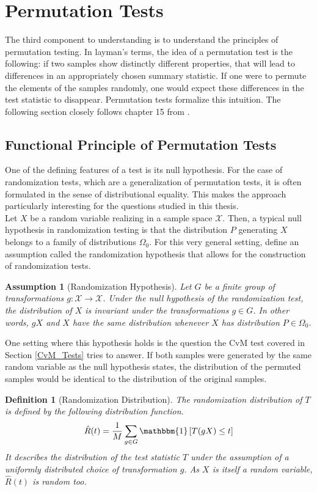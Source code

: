 \documentclass[12pt, a4paper]{article}
\theoremstyle{MAstyle} \newtheorem{assumption}{Assumption}[section]
\theoremstyle{MAstyle} \newtheorem{definition}{Definition}[section]
\theoremstyle{MAstyle} \newtheorem{theorem}{Theorem}[section]
\begin{document}
	\section{Permutation Tests}\label{Permutation_Tests}
		The third component to understanding \cite{bugni_permutation_2021} is to understand the principles of permutation testing.
		In layman's terms, the idea of a permutation test is the following: if two samples show distinctly different properties, that will lead to differences in an appropriately chosen summary statistic. If one were to permute the elements of the samples randomly, one would expect these differences in the test statistic to disappear.
		Permutation tests formalize this intuition. The following section closely follows chapter 15 from \cite{lehmann_testing_2005}.
	
		\subsection{Functional Principle of Permutation Tests}\label{perm_tests}
			One of the defining features of a test is its null hypothesis. For the case of randomization tests, which are a generalization of permutation tests, it is often formulated in the sense of distributional equality.  This makes the approach particularly interesting for the questions studied in this thesis. \\
						
			Let $X$ be a random variable realizing in a sample space $\mathcal{X}$. Then, a typical null hypothesis in randomization testing is that the distribution $P$ generating $X$ belongs to a family of distributions $\Omega_0$. For this very general setting, \cite{lehmann_testing_2005} define an assumption called the randomization hypothesis that allows for the construction of randomization tests.
			
			\begin{assumption}[Randomization Hypothesis]\label{rand_hypo}
				 Let $G$ be a finite group of transformations $g: \mathcal{X} \rightarrow \mathcal{X}$. Under the null hypothesis of the randomization test, the distribution of $X$ is invariant under the transformations $g \in G$. In other words, $gX$ and $X$ have the same distribution whenever $X$ has distribution $P \in \Omega_0$.
			\end{assumption}
			One setting where this hypothesis holds is the question the CvM test covered in Section \ref{CvM_Tests} tries to answer. If both samples were generated by the same random variable as the null hypothesis states, the distribution of the permuted samples would be identical to the distribution of the original samples.
			\begin{definition}[Randomization Distribution]\label{rand_dist}
				The randomization distribution of $T$ is defined by the following distribution function.
				$$\hat{R}(t) = \frac{1}{M} \sum_{g \in G} \mathbbm{1} \left[T(gX) \leq t\right]$$
				It describes the distribution of the test statistic $T$ under the assumption of a uniformly distributed choice of transformation $g$. As $X$ is itself a random variable, $\hat{R}(t)$ is random too.
			\end{definition}
			
\end{document}

